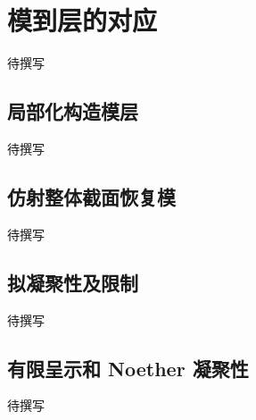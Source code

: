 
% 
% 

\section{模到层的对应}
\label{g5:sec:1301}

待撰写

\subsection{局部化构造模层}
\label{g5:subsec:1301:01}
待撰写

\subsection{仿射整体截面恢复模}
\label{g5:subsec:1301:02}
待撰写

\subsection{拟凝聚性及限制}
\label{g5:subsec:1301:03}
待撰写

\subsection{有限呈示和 Noether 凝聚性}
\label{g5:subsec:1301:04}
待撰写

